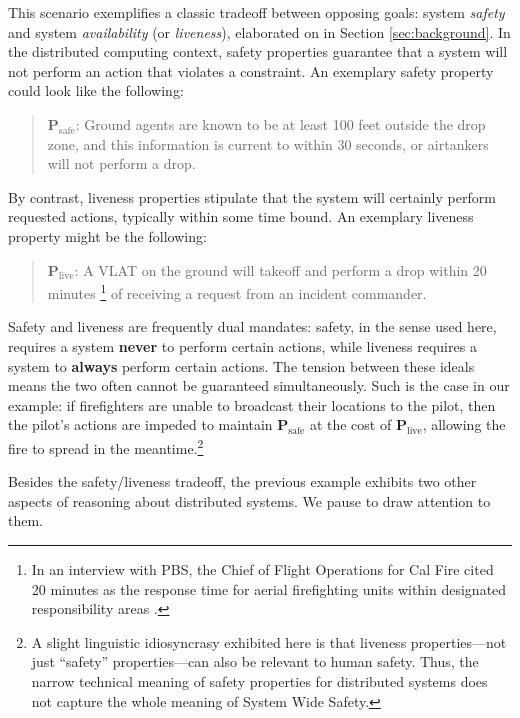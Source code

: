 \documentclass[]             %
{NASA}                       %
\theoremstyle{definition}
\begin{document}
This scenario exemplifies a classic tradeoff between opposing goals:
system \emph{safety} and system \emph{availability} (or
\emph{liveness}), elaborated on in Section \ref{sec:background}. In
the distributed computing context, safety properties guarantee that a
system will not perform an action that violates a constraint. An
exemplary safety property could look like the following:
\begin{quote}
  $\textbf{P}_\textrm{safe}$: Ground agents are known to be at least
  100 feet outside the drop zone, and this information is current to
  within 30 seconds, or airtankers will not perform a drop.
\end{quote}
By contrast, liveness properties stipulate that the system will
certainly perform requested actions, typically within some time
bound. An exemplary liveness property might be the following:
\begin{quote}
  $\textbf{P}_\textrm{live}$: A VLAT on the ground will takeoff and
  perform a drop within 20 minutes \footnote{In an interview with
  PBS, the Chief of Flight Operations for Cal Fire cited 20
  \mbox{minutes} as the response time for aerial firefighting units
  within designated responsibility areas
  \cite{2021:aerialfirefighting}.} of receiving a request from an
  incident commander.
\end{quote}

Safety and liveness are frequently dual mandates: safety, in the sense
used here, requires a system \textbf{never} to perform certain
actions, while liveness requires a system to \textbf{always} perform
certain actions. The tension between these ideals means the two often
cannot be guaranteed simultaneously. Such is the case in our example:
if firefighters are unable to broadcast their locations to the pilot,
then the pilot's actions are impeded to maintain
\(\textbf{P}_\textrm{safe}\) at the cost of
\(\textbf{P}_\textrm{live}\), allowing the fire to spread in the
meantime.\footnote{A slight linguistic idiosyncrasy exhibited here is
that liveness properties---not just ``safety'' properties---can also
be relevant to human safety. Thus, the narrow technical meaning of
safety properties for distributed systems does not capture the whole
meaning of System Wide Safety.}

Besides the safety/liveness tradeoff, the previous example exhibits
two other aspects of reasoning about distributed systems. We pause to
draw attention to them.
\end{document}
